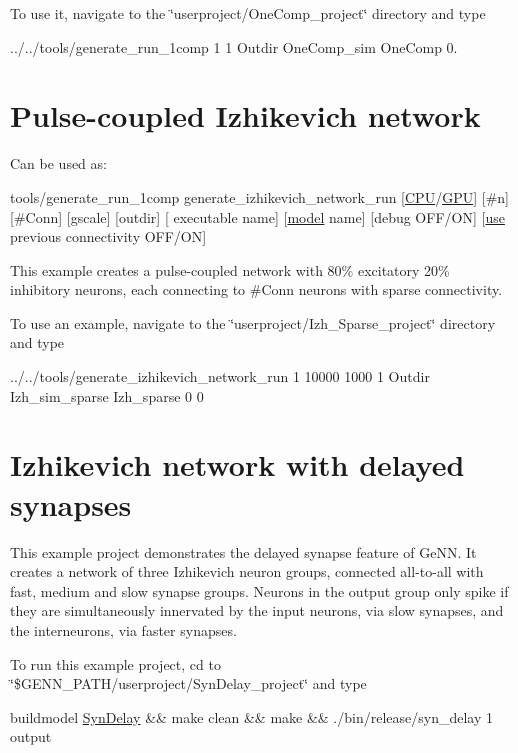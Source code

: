 To use it, navigate to the \char`\"{}userproject/\+One\+Comp\+\_\+project\char`\"{} directory and type 
\begin{DoxyCode}
../../tools/generate\_run\_1comp 1 1 Outdir OneComp\_sim OneComp 0.
\end{DoxyCode}
\hypertarget{2_examples_ex_izhnetwork}{}\section{Pulse-\/coupled Izhikevich network}\label{2_examples_ex_izhnetwork}
Can be used as\+: 
\begin{DoxyCode}
tools/generate\_run\_1comp generate\_izhikevich\_network\_run [\hyperlink{README_8txt_a74a069e3c75797de2636c4dd14daa147}{CPU}/\hyperlink{modelSpec_8h_a39cb9803524b6f3b783344b2f89867b4}{GPU}] [#n] [#Conn] [gscale] [outdir] [
      executable name] [\hyperlink{README_8txt_a69fd801b7213948c12d9dd7eebb3ed14}{model} name] [debug OFF/ON] [\hyperlink{README_8txt_acf386c48a14a2099c9220d6bcde40fc8}{use} previous connectivity OFF/ON]
\end{DoxyCode}
 This example creates a pulse-\/coupled network \cite{izhikevich2003simple} with 80\% excitatory 20\% inhibitory neurons, each connecting to \#\+Conn neurons with sparse connectivity.

To use an example, navigate to the \char`\"{}userproject/\+Izh\+\_\+\+Sparse\+\_\+project\char`\"{} directory and type 
\begin{DoxyCode}
../../tools/generate\_izhikevich\_network\_run 1 10000 1000 1 Outdir Izh\_sim\_sparse Izh\_sparse 0 0
\end{DoxyCode}
\hypertarget{2_examples_ex_izhdelay}{}\section{Izhikevich network with delayed synapses}\label{2_examples_ex_izhdelay}
This example project demonstrates the delayed synapse feature of Ge\+N\+N. It creates a network of three Izhikevich neuron groups, connected all-\/to-\/all with fast, medium and slow synapse groups. Neurons in the output group only spike if they are simultaneously innervated by the input neurons, via slow synapses, and the interneurons, via faster synapses.

To run this example project, cd to \char`\"{}\$\+G\+E\+N\+N\+\_\+\+P\+A\+T\+H/userproject/\+Syn\+Delay\+\_\+project\char`\"{} and type 
\begin{DoxyCode}
buildmodel \hyperlink{classSynDelay}{SynDelay} && make clean && make && ./bin/release/syn\_delay 1 output
\end{DoxyCode}
 